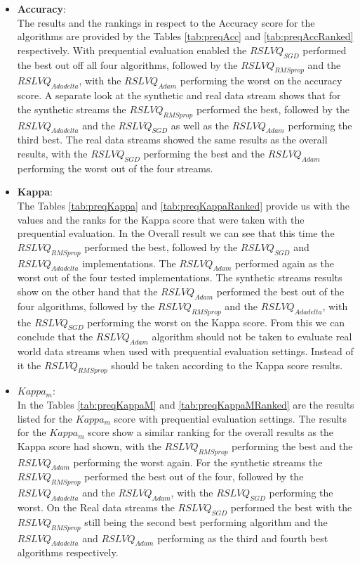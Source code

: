 \documentclass[12pt,oneside,a4paper,parskip]{scrbook}
\begin{document}
\begin{itemize}
  \item \textbf{Accuracy}: \\
  The results and the rankings in respect to the Accuracy score for the algorithms are provided by the Tables \ref{tab:preqAcc} and \ref{tab:preqAccRanked}
  respectively.
  With prequential evaluation enabled the $RSLVQ_\textit{SGD}$ performed the best out off all four algorithms, followed by the 
  $RSLVQ_\textit{RMSprop}$ and the $RSLVQ_\textit{Adadelta}$, with the $RSLVQ_\textit{Adam}$ performing the worst on the accuracy score.
  A separate look at the synthetic and real data stream shows that for the synthetic streams the $RSLVQ_\textit{RMSprop}$ performed the best,
  followed by the $RSLVQ_\textit{Adadelta}$ and the $RSLVQ_\textit{SGD}$ as well as the $RSLVQ_\textit{Adam}$ performing the third best.
  The real data streams showed the same results as the overall results, with the $RSLVQ_\textit{SGD}$ performing the best and the $RSLVQ_\textit{Adam}$ performing
  the worst out of the four streams.

  \item \textbf{Kappa}: \\
  The Tables \ref{tab:preqKappa} and \ref{tab:preqKappaRanked} provide us with the values and the ranks for the Kappa score that were taken with the
  prequential evaluation.
  In the Overall result we can see that this time the $RSLVQ_\textit{RMSprop}$ performed the best, followed by the $RSLVQ_\textit{SGD}$ 
  and $RSLVQ_\textit{Adadelta}$ implementations. The $RSLVQ_\textit{Adam}$ performed again as the worst out of the four tested implementations.
  The synthetic streams results show on the other hand that the $RSLVQ_\textit{Adam}$ performed the best out of the four algorithms, followed by 
  the $RSLVQ_\textit{RMSprop}$ and the $RSLVQ_\textit{Adadelta}$, with the $RSLVQ_\textit{SGD}$ performing the worst on the Kappa score.
  From this we can conclude that the $RSLVQ_\textit{Adam}$ algorithm should not be taken to evaluate real world data streams when used with
  prequential evaluation settings. Instead of it the $RSLVQ_\textit{RMSprop}$ should be taken according to the Kappa score results.
  
  \item \textbf{$Kappa_m$}: \\
  In the Tables \ref{tab:preqKappaM} and \ref{tab:preqKappaMRanked} are the results listed for the $Kappa_m$ score with prequential evaluation settings.
  The results for the $Kappa_m$ score show a similar ranking for the overall results as the Kappa score had shown, with the 
  $RSLVQ_\textit{RMSprop}$ performing the best and the $RSLVQ_\textit{Adam}$ performing the worst again.
  For the synthetic streams the $RSLVQ_\textit{RMSprop}$ performed the best out of the four, followed by the $RSLVQ_\textit{Adadelta}$ and the
  $RSLVQ_\textit{Adam}$, with the $RSLVQ_\textit{SGD}$ performing the worst.
  On the Real data streams the $RSLVQ_\textit{SGD}$ performed the best with the $RSLVQ_\textit{RMSprop}$ still being the second best performing
  algorithm and the $RSLVQ_\textit{Adadelta}$ and $RSLVQ_\textit{Adam}$ performing as the third and fourth best algorithms respectively.
  

\end{itemize}
\end{document}

